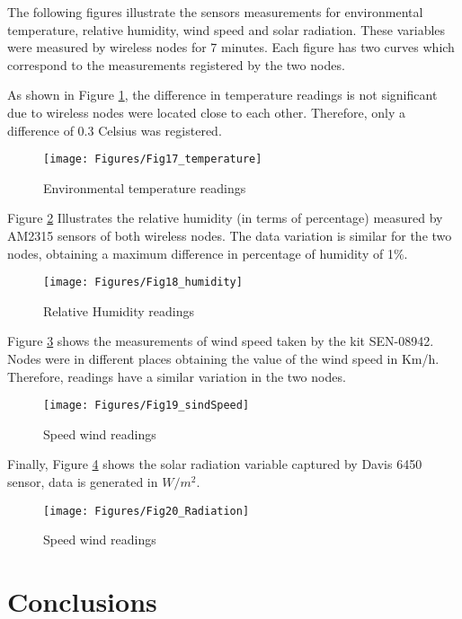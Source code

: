 The following figures illustrate the sensors measurements for environmental temperature, relative humidity, wind speed and solar radiation. These variables were measured by wireless nodes for 7 minutes. Each figure has two curves which correspond to the measurements registered by the two nodes.

As shown in Figure \ref{ch5_fig:17}, the difference in temperature readings is not significant due to wireless nodes were located close to each other. Therefore, only a difference of 0.3 Celsius was registered.

\begin{figure}[ht!]
\centering
\texttt{[image: Figures/Fig17\_temperature]}
\caption{Environmental temperature readings}
\label{ch5_fig:17}       %
\end{figure}

Figure \ref{ch5_fig:18} Illustrates the relative humidity (in terms of percentage) measured by AM2315 sensors of both wireless nodes. The data variation is similar for the two nodes, obtaining a maximum difference in percentage of humidity of 1$\%$.

\begin{figure}[ht!]
\centering
\texttt{[image: Figures/Fig18\_humidity]}
\caption{Relative Humidity readings}
\label{ch5_fig:18}       %
\end{figure}

Figure \ref{ch5_fig:19} shows the measurements of wind speed taken by the kit SEN-08942. Nodes were in different places obtaining the value of the wind speed in Km/h. Therefore, readings have a similar variation in the two nodes.

\begin{figure}[ht!]
\centering
\texttt{[image: Figures/Fig19\_sindSpeed]}
\caption{Speed wind readings}
\label{ch5_fig:19}       %
\end{figure}

Finally, Figure \ref{ch5_fig:20} shows the solar radiation variable captured by Davis 6450 sensor, data is generated in $W/m^{2}$.

\begin{figure}[ht!]
\centering
\texttt{[image: Figures/Fig20\_Radiation]}
\caption{Speed wind readings}
\label{ch5_fig:20}       %
\end{figure}

\section{Conclusions}
\label{sec:5.7}

